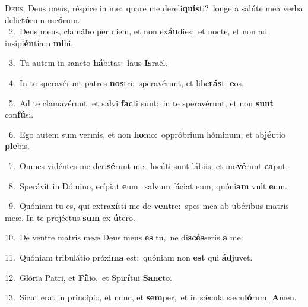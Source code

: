 \lettrine{\initial\textcolor{\initialcolor}{D}}{eus,} Deus meus, réspice in me:~\dagger quare me dereli\-\textbf{quís}\-ti?~\star longe a salúte mea verba delic\-\textbf{tó}\-rum me\-\textbf{ó}\-rum.\\
{\numbfont\textcolor{\numbcolor}{~2.}}~Deus meus, clamábo per diem, et non ex\-\textbf{áu}\-dies:~\star et nocte, et non ad insipi\-\textbf{én}\-tiam \textbf{mi}\-hi.\par
{\numbfont\textcolor{\numbcolor}{~3.}}~Tu autem in sancto \textbf{há}\-bitas:~\star laus \textbf{Is}\-raël.\par
{\numbfont\textcolor{\numbcolor}{~4.}}~In te speravérunt patres \textbf{nos}\-tri:~\star speravérunt, et libe\-\textbf{rás}\-ti \textbf{e}\-os.\par
{\numbfont\textcolor{\numbcolor}{~5.}}~Ad te clamavérunt, et salvi \textbf{fac}\-ti sunt:~\star in te speravérunt, et non \textbf{sunt} con\-\textbf{fú}\-si.\par
{\numbfont\textcolor{\numbcolor}{~6.}}~Ego autem sum vermis, et non \textbf{ho}\-mo:~\star oppróbrium hóminum, et ab\-\textbf{jéc}\-tio \textbf{ple}\-bis.\par
{\numbfont\textcolor{\numbcolor}{~7.}}~Omnes vidéntes me deri\-\textbf{sé}\-runt me:~\star locúti sunt lábiis, et mo\-\textbf{vé}\-runt \textbf{ca}\-put.\par
{\numbfont\textcolor{\numbcolor}{~8.}}~Sperávit in Dómino, erípiat \textbf{e}\-um:~\star salvum fáciat eum, quóni\textbf{am} vult \textbf{e}\-um.\par
{\numbfont\textcolor{\numbcolor}{~9.}}~Quóniam tu es, qui extraxísti me de \textbf{ven}\-tre:~\star spes mea ab ubéribus matris meæ. In te projéctus \textbf{sum} ex \textbf{ú}\-tero.\par
{\numbfont\textcolor{\numbcolor}{10.}}~De ventre matris meæ Deus meus \textbf{es} tu,~\star ne di\-\textbf{scés}\-seris \textbf{a} me:\par
{\numbfont\textcolor{\numbcolor}{11.}}~Quóniam tribulátio próxi\textbf{ma} est:~\star quóniam non \textbf{est} qui \textbf{ád}\-juvet.\par
{\numbfont\textcolor{\numbcolor}{12.}}~Glória Patri, et \textbf{Fí}\-lio,~\star et Spi\-\textbf{rí}\-tui \textbf{Sanc}\-to.\par
{\numbfont\textcolor{\numbcolor}{13.}}~Sicut erat in princípio, et nunc, et \textbf{sem}\-per,~\star et in sǽcula sæcu\-\textbf{ló}\-rum. \textbf{A}\-men.\par
